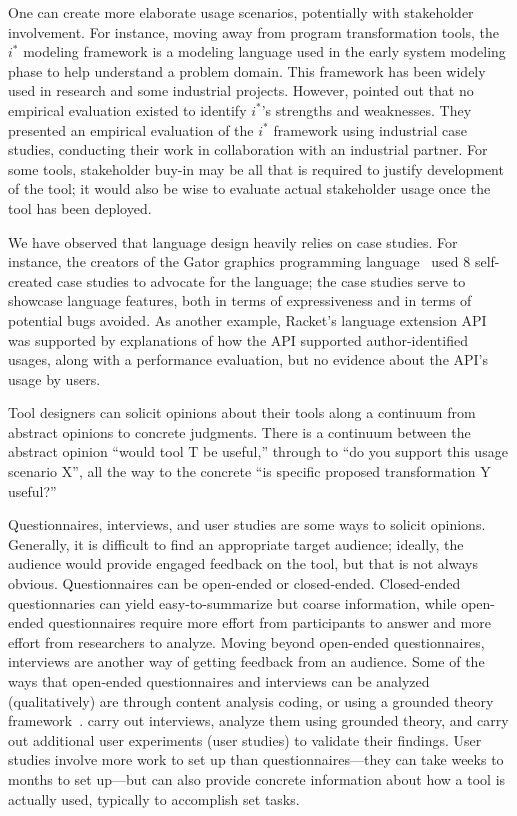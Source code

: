 One can create more elaborate usage scenarios, potentially
with stakeholder involvement.
For instance, moving away from program transformation tools, the $i^*$ modeling framework is a modeling language used in the early
system modeling phase to help understand a problem domain. This
framework has been widely used in research and some industrial
projects. However,  pointed out that no
empirical evaluation existed to identify $i^*$'s strengths and
weaknesses. They presented an empirical evaluation of the $i^*$
framework using industrial case studies, conducting their work in
collaboration with an industrial partner. 
For some tools, stakeholder buy-in may be all that is required
to justify development of the tool; it would also be wise to
evaluate actual stakeholder usage once the tool has been deployed.

We have observed that language design heavily relies on case studies.
For instance, the creators of the Gator graphics programming language~\cite{geisler20:_geomet_types_graph_progr} used 8 self-created case studies to advocate for the language; the case studies serve to showcase language features, both in terms of expressiveness and in terms of potential bugs avoided. As another example, Racket's language extension API~\cite{tobin-hochstadt11:_languag_librar} was supported by explanations of how the API supported author-identified usages, along with a performance evaluation, but no evidence about the API's usage by users.

Tool designers can solicit opinions about their tools along a continuum from abstract
opinions to concrete judgments. There is a continuum between the
abstract opinion ``would tool T be useful,'' through to ``do you
support this usage scenario X'', all the way to the concrete ``is
specific proposed transformation Y useful?''

Questionnaires, interviews, and user studies are some ways to solicit opinions. 
Generally, it is difficult to find an appropriate
target audience; ideally, the audience would provide engaged feedback
on the tool, but that is not always obvious.  Questionnaires can be
open-ended or closed-ended. Closed-ended questionnaries can yield
easy-to-summarize but coarse information, while open-ended
questionnaires require more effort from participants to answer and
more effort from researchers to analyze. Moving beyond open-ended
questionnaires, interviews are another way of getting feedback
from an audience. Some of the ways that open-ended questionnaires and interviews can be 
analyzed (qualitatively) are through content analysis coding, or 
using a grounded theory framework~\cite{glaser67:_discov_groun_theor}.
 carry out interviews, analyze them using grounded
theory, and carry out additional user experiments (user studies)
to validate their findings.
User studies involve more work to set up than questionnaires---they can take weeks to months to set up---but can also provide concrete
information about how a tool is actually used, typically to accomplish set tasks.

